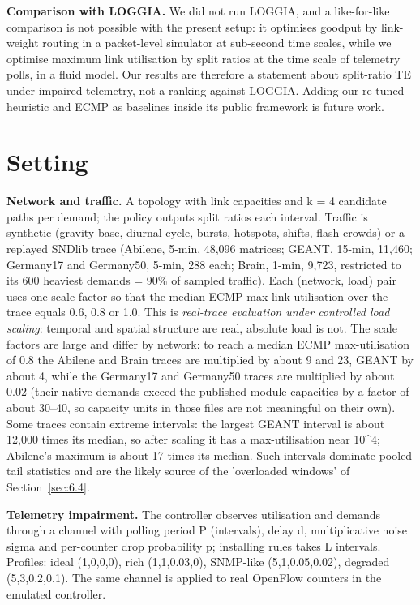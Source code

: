 \documentclass[journal]{IEEEtran}
\begin{document}
\textbf{Comparison with LOGGIA.} We did not run LOGGIA, and a like-for-like comparison is not possible with the present setup: it optimises goodput by link-weight routing in a packet-level simulator at sub-second time scales, while we optimise maximum link utilisation by split ratios at the time scale of telemetry polls, in a fluid model. Our results are therefore a statement about split-ratio TE under impaired telemetry, not a ranking against LOGGIA. Adding our re-tuned heuristic and ECMP as baselines inside its public framework is future work.

\section{Setting}
\label{sec:3}
\textbf{Network and traffic.} A topology with link capacities and k = 4 candidate paths per demand; the policy outputs split ratios each interval. Traffic is synthetic (gravity base, diurnal cycle, bursts, hotspots, shifts, flash crowds) or a replayed SNDlib trace \cite{r20} (Abilene, 5-min, 48,096 matrices; GEANT, 15-min, 11,460; Germany17 and Germany50, 5-min, 288 each; Brain, 1-min, 9,723, restricted to its 600 heaviest demands = 90\% of sampled traffic). Each (network, load) pair uses one scale factor so that the median ECMP max-link-utilisation over the trace equals 0.6, 0.8 or 1.0. This is \textit{real-trace evaluation under controlled load scaling}: temporal and spatial structure are real, absolute load is not. The scale factors are large and differ by network: to reach a median ECMP max-utilisation of 0.8 the Abilene and Brain traces are multiplied by about 9 and 23, GEANT by about 4, while the Germany17 and Germany50 traces are multiplied by about 0.02 (their native demands exceed the published module capacities by a factor of about 30--40, so capacity units in those files are not meaningful on their own). Some traces contain extreme intervals: the largest GEANT interval is about 12,000 times its median, so after scaling it has a max-utilisation near 10\^{}4; Abilene's maximum is about 17 times its median. Such intervals dominate pooled tail statistics and are the likely source of the 'overloaded windows' of Section~\ref{sec:6.4}.

\textbf{Telemetry impairment.} The controller observes utilisation and demands through a channel with polling period P (intervals), delay d, multiplicative noise sigma and per-counter drop probability p; installing rules takes L intervals. Profiles: ideal (1,0,0,0), rich (1,1,0.03,0), SNMP-like (5,1,0.05,0.02), degraded (5,3,0.2,0.1). The same channel is applied to real OpenFlow counters in the emulated controller.
\end{document}
